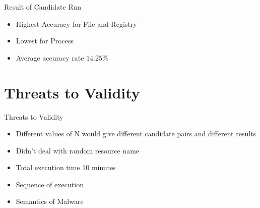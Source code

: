\documentclass{beamer}
\begin{document}
\begin{frame}[t]{Result of Candidate Run}
\begin{itemize}
  \item Highest Accuracy for File and Registry
  \item Lowest for Process
  \item Average accuracy rate $14.25\%$
\end{itemize}
\end{frame}

\section{Threats to Validity}
\begin{frame}{Threats to Validity}
  \begin{itemize}
    \item Different values of N would give different candidate pairs and different results
    \item Didn't deal with random resource name
    \item Total execution time 10 minutes
    \item Sequence of execution
    \item Semantics of Malware
  \end{itemize}
\end{frame}
\end{document}
